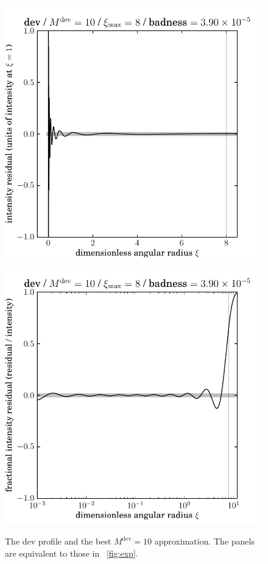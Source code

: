 \documentclass[12pt,pdftex,preprint]{aastex}
\newlength{\figurewidth}
\newcommand{\dev}{\mathrm{dev}}
\begin{document}
\begin{figure}
\includegraphics[width=\figurewidth]{dev_K10_MR08_residual.pdf}%
\includegraphics[width=\figurewidth]{dev_K10_MR08_fractional_log.pdf}
\caption{The dev profile and the best $M^{\dev}=10$ approximation.
  The panels are equivalent to those in \figurename~\ref{fig:exp}.}
\end{figure}
\end{document}
